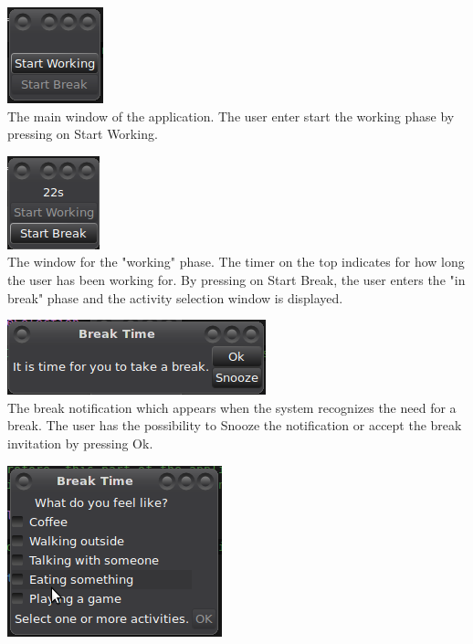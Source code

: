 \documentclass[english]{tktltiki}
\begin{document}
	\begin{center}
		\includegraphics{images/app-screenshots/mainwindow-cropped.png} \\
		
		The main window of the application. The user enter start the working phase by pressing on Start Working. 
		
		\includegraphics{images/app-screenshots/working-cropped.png} \\
		
		The window for the "working" phase. The timer on the top indicates for how long the user has been working for. By pressing on Start Break, the user enters the "in break" phase and the activity selection window is displayed. 
	
		\includegraphics{images/app-screenshots/break-notification-cropped.png} \\
		
		The break notification which appears when the system recognizes the need for a break. The user has the possibility to Snooze the notification or accept the break invitation by pressing Ok. 
		
		\pagebreak
		
		\includegraphics{images/app-screenshots/activity-selection.png} \\
		

\end{center}
\end{document}
